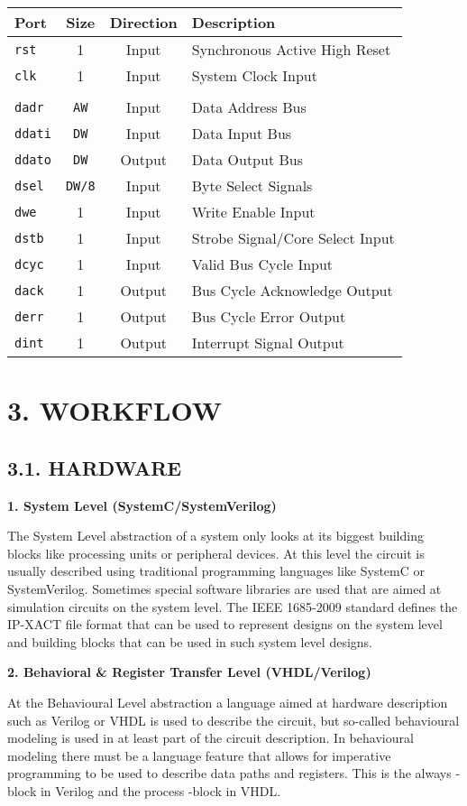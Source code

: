 \documentclass[]{article}
\begin{document}
\begin{longtable}[]{@{}lccl@{}}
\toprule
Port & Size & Direction & Description\tabularnewline
\midrule
\endhead
\texttt{rst} & 1 & Input & Synchronous Active High Reset\tabularnewline
\texttt{clk} & 1 & Input & System Clock Input\tabularnewline
& & &\tabularnewline
\texttt{dadr} & \texttt{AW} & Input & Data Address Bus\tabularnewline
\texttt{ddati} & \texttt{DW} & Input & Data Input Bus\tabularnewline
\texttt{ddato} & \texttt{DW} & Output & Data Output Bus\tabularnewline
\texttt{dsel} & \texttt{DW/8} & Input & Byte Select
Signals\tabularnewline
\texttt{dwe} & 1 & Input & Write Enable Input\tabularnewline
\texttt{dstb} & 1 & Input & Strobe Signal/Core Select
Input\tabularnewline
\texttt{dcyc} & 1 & Input & Valid Bus Cycle Input\tabularnewline
\texttt{dack} & 1 & Output & Bus Cycle Acknowledge Output\tabularnewline
\texttt{derr} & 1 & Output & Bus Cycle Error Output\tabularnewline
\texttt{dint} & 1 & Output & Interrupt Signal Output\tabularnewline
\bottomrule
\end{longtable}

\section{3. WORKFLOW}\label{workflow}

\subsection{3.1. HARDWARE}\label{hardware}

\textbf{1. System Level (SystemC/SystemVerilog)}

The System Level abstraction of a system only looks at its biggest
building blocks like processing units or peripheral devices. At this
level the circuit is usually described using traditional programming
languages like SystemC or SystemVerilog. Sometimes special software
libraries are used that are aimed at simulation circuits on the system
level. The IEEE 1685-2009 standard defines the IP-XACT file format that
can be used to represent designs on the system level and building blocks
that can be used in such system level designs.

\textbf{2. Behavioral \& Register Transfer Level (VHDL/Verilog)}

At the Behavioural Level abstraction a language aimed at hardware
description such as Verilog or VHDL is used to describe the circuit, but
so-called behavioural modeling is used in at least part of the circuit
description. In behavioural modeling there must be a language feature
that allows for imperative programming to be used to describe data paths
and registers. This is the always -block in Verilog and the process
-block in VHDL.
\end{document}
